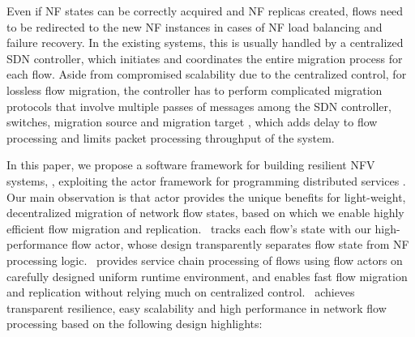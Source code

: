 Even if NF states can be correctly acquired and NF replicas created, flows need to be redirected to the new NF instances in cases of NF load balancing and failure recovery. In the existing systems, this is usually handled by a centralized SDN controller, which initiates and coordinates the entire migration process for each flow. Aside from compromised scalability due to the centralized control, for lossless flow migration, the controller has to perform complicated migration protocols that involve multiple passes of messages among the SDN controller, switches, migration source and migration target \cite{gember2015opennf}, which adds delay to flow processing and limits packet processing throughput of the system.


In this paper, we propose a software framework for building resilient NFV systems, \nfactor, exploiting the actor framework for programming distributed services \cite{actor-wiki, akka, newell2016optimizing}. Our main observation is that actor provides the unique benefits for light-weight, decentralized migration of network flow states, based on which we enable highly efficient flow migration and replication. %
\nfactor~tracks each flow's state with our high-performance flow actor, whose design transparently separates flow state from NF processing logic. \nfactor~provides service chain processing of flows using flow actors on carefully designed uniform runtime environment, and enables fast flow migration and replication without relying much on centralized control.
\nfactor~achieves transparent resilience, easy scalability and high performance in network flow processing based on the following design highlights: %

